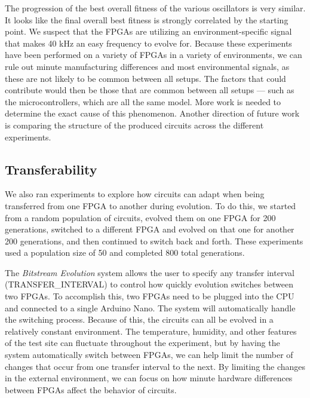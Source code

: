 \documentclass{ieeeaccess}
\begin{document}
The progression of the best overall fitness of the various oscillators is very similar. It looks like the final overall best fitness is strongly correlated by the starting point. 
We suspect that the FPGAs are utilizing an environment-specific signal that makes 40 kHz an easy frequency to evolve for. Because these experiments have been performed on a variety of FPGAs in a variety of environments, we can rule out minute manufacturing differences and most environmental signals, as these are not likely to be common between all setups. The factors that could contribute would then be those that are common between all setups --- such as the microcontrollers, which are all the same model. More work is needed to determine the exact cause of this phenomenon. Another direction of future work is comparing the structure of the produced circuits across the different experiments.

\subsection{Transferability}
\label{transferability}



We also ran experiments to explore how circuits can adapt when being transferred from one FPGA to another during evolution. To do this, we started from a random population of circuits, evolved them on one FPGA for 200 generations, switched to a different FPGA and evolved on that one for another 200 generations, and then continued to switch back and forth. These experiments used a population size of 50 and completed 800 total generations.

The \textit{Bitstream Evolution} system allows the user to specify any transfer interval (TRANSFER\_INTERVAL) to control how quickly evolution switches between two FPGAs. To accomplish this, two FPGAs need to be plugged into the CPU and connected to a single Arduino Nano. The system will automatically handle the switching process. Because of this, the circuits can all be evolved in a relatively constant environment. The temperature, humidity, and other features of the test site can fluctuate throughout the experiment, but by having the system automatically switch between FPGAs, we can help limit the number of changes that occur from one transfer interval to the next. By limiting the changes in the external environment, we can focus on how minute hardware differences between FPGAs affect the behavior of circuits. 
\end{document}
